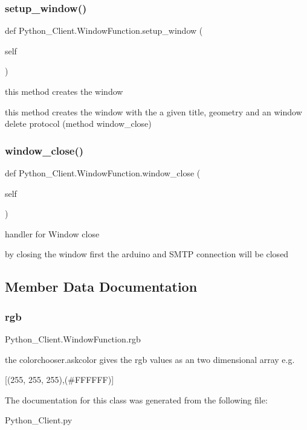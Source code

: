 \subsubsection{\texorpdfstring{setup\+\_\+window()}{setup\_window()}}
{\footnotesize\ttfamily def Python\+\_\+\+Client.\+Window\+Function.\+setup\+\_\+window (\begin{DoxyParamCaption}\item[{}]{self }\end{DoxyParamCaption})}



this method creates the window 

this method creates the window with the a given title, geometry and an window delete protocol (method window\+\_\+close) \mbox{\label{class_python___client_1_1_window_function_a468af5948b986f639f15ae2f5a490afb}} 
\subsubsection{\texorpdfstring{window\+\_\+close()}{window\_close()}}
{\footnotesize\ttfamily def Python\+\_\+\+Client.\+Window\+Function.\+window\+\_\+close (\begin{DoxyParamCaption}\item[{}]{self }\end{DoxyParamCaption})}



handler for Window close 

by closing the window first the arduino and S\+M\+TP connection will be closed 

\subsection{Member Data Documentation}
\mbox{\label{class_python___client_1_1_window_function_a6c0768916064d607a4d39441863eabe2}} 
\subsubsection{\texorpdfstring{rgb}{rgb}}
{\footnotesize\ttfamily Python\+\_\+\+Client.\+Window\+Function.\+rgb}



the colorchooser.\+askcolor gives the rgb values as an two dimensional array e.\+g. 

\mbox{[}(255, 255, 255),(\#\+F\+F\+F\+F\+FF)\mbox{]} 

The documentation for this class was generated from the following file\+:\begin{DoxyCompactItemize}
\item 
Python\+\_\+\+Client.\+py\end{DoxyCompactItemize}

